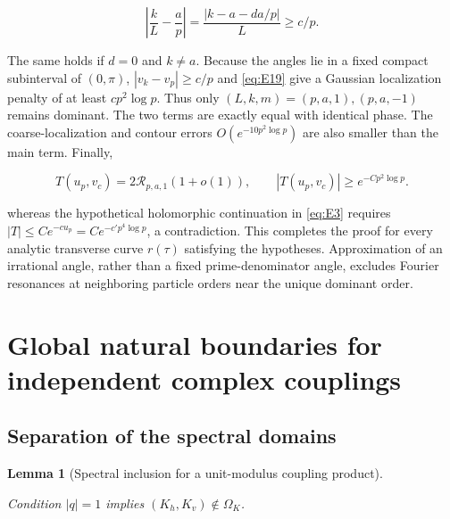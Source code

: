 \documentclass[11pt,a4paper]{article}
\numberwithin{equation}{section}
\theoremstyle{plain}
\newtheorem{lemma}[theorem]{Lemma}
\theoremstyle{definition}
\begin{document}
\[\left|\frac{k}{L}-\frac{a}{p}\right|=\frac{|k-a-d a/p|}{L}\ge c/p.\]

The same holds if \(d=0\) and \(k\ne a\). Because the angles lie in a fixed compact subinterval of \((0,\pi)\), \(|v_k-v_p|\ge c/p\) and \eqref{eq:E19} give a Gaussian localization penalty of at least \(c p^2\log p\). Thus only \((L,k,m)=(p,a,1),(p,a,-1)\) remains dominant. The two terms are exactly equal with identical phase. The coarse-localization and contour errors \(O(e^{-10p^2\log p})\) are also smaller than the main term. Finally,

\begin{equation}
T(u_p,v_c)=2\mathcal R_{p,a,1}(1+o(1)),\qquad |T(u_p,v_c)|\ge e^{-C p^2\log p}.
\label{eq:E20}
\end{equation}

whereas the hypothetical holomorphic continuation in \eqref{eq:E3} requires \(|T|\le C e^{-c u_p}=C e^{-c' p^4\log p}\), a contradiction. This completes the proof for every analytic transverse curve \(r(\tau)\) satisfying the hypotheses. Approximation of an irrational angle, rather than a fixed prime-denominator angle, excludes Fourier resonances at neighboring particle orders near the unique dominant order.

\section{Global natural boundaries for independent complex couplings}\label{sec:global}

\subsection{Separation of the spectral domains}\label{sec:separation}

\begin{lemma}[Spectral inclusion for a unit-modulus coupling product]\label{lem:separation}

Condition \(|q|=1\) implies \((K_h,K_v)\notin\Omega_K\).

\end{lemma}
\end{document}
